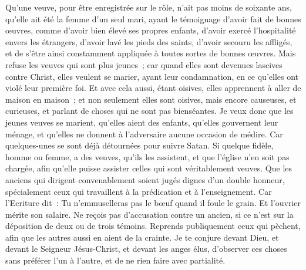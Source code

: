 \begin{multicols}{2}
Qu'une veuve, pour être enregistrée sur le rôle, n'ait pas moins de soixante ans, qu'elle ait été la femme d'un seul mari,
ayant le témoignage d'avoir fait de bonnes œuvres, comme d'avoir bien élevé ses propres enfants, d'avoir exercé l'hospitalité envers les étrangers, d'avoir lavé les pieds des saints, d'avoir secouru les affligés, et de s'être ainsi constamment appliquée à toutes sortes de bonnes œuvres.
Mais refuse les veuves qui sont plus jeunes~; car quand elles sont devenues lascives contre Christ, elles veulent se marier,
ayant leur condamnation, en ce qu'elles ont violé leur première foi.
Et avec cela aussi, étant oisives, elles apprennent à aller de maison en maison~; et non seulement elles sont oisives, mais encore causeuses, et curieuses, et parlant de choses qui ne sont pas bienséantes.
Je veux donc que les jeunes veuves se marient, qu'elles aient des enfants, qu'elles gouvernent leur ménage, et qu'elles ne donnent à l'adversaire aucune occasion de médire.
Car quelques-unes se sont déjà détournées pour suivre Satan.
Si quelque fidèle, homme ou femme, a des veuves, qu'ils les assistent, et que l'église n'en soit pas chargée, afin qu'elle puisse assister celles qui sont véritablement veuves.
Que les anciens qui dirigent convenablement soient jugés dignes d'un double honneur, spécialement ceux qui travaillent à la prédication et à l'enseignement.
Car l'Ecriture dit~: Tu n'emmuselleras pas le bœuf quand il foule le grain. Et l'ouvrier mérite son salaire.
Ne reçois pas d'accusation contre un ancien, si ce n'est sur la déposition de deux ou de trois témoins.
Reprends publiquement ceux qui pèchent, afin que les autres aussi en aient de la crainte.
Je te conjure devant Dieu, et devant le Seigneur Jésus-Christ, et devant les anges élus, d'observer ces choses sans préférer l'un à l'autre, et de ne rien faire avec partialité.

\end{multicols}
